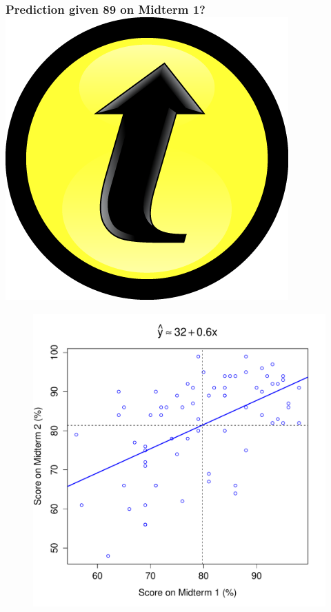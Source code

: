 \documentclass[handout]{beamer}
\begin{document}
\begin{frame}
\frametitle{Prediction given 89 on Midterm 1? \hfill \includegraphics[scale = 0.05]{./images/clicker} }
\begin{figure}
	\includegraphics[scale = 0.48]{./images/midterms5}
\end{figure}
\end{frame}
\end{document}
